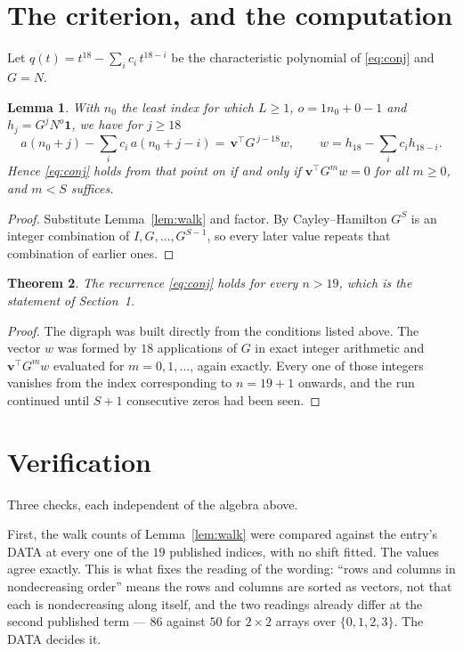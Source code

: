 \documentclass[11pt,a4paper]{article}
\theoremstyle{plain}
\newtheorem{theorem}{Theorem}
\newtheorem{lemma}[theorem]{Lemma}
\theoremstyle{definition}
\begin{document}
\section{The criterion, and the computation}

Let $q(t)=t^{18}-\sum_i c_i\,t^{18-i}$ be the characteristic polynomial of
\eqref{eq:conj} and $G=N$.

\begin{lemma}\label{lem:crit}
With $n_0$ the least index for which $L\ge1$, $o=1n_0+0-1$ and
$h_j=G^{j}N^{o}\mathbf{1}$, we have for $j\ge18$
\[
a(n_0+j)-\sum_i c_i\,a(n_0+j-i)=\,\mathbf{v}^{\!\top}G^{\,j-18}w,
\qquad w=h_{18}-\sum_i c_ih_{18-i} .
\]
Hence \eqref{eq:conj} holds from that point on if and only if
$\mathbf{v}^{\!\top}G^{m}w=0$ for all $m\ge0$, and $m<S$ suffices.
\end{lemma}

\begin{proof}
Substitute Lemma~\ref{lem:walk} and factor. By Cayley--Hamilton $G^{S}$ is an integer
combination of $I,G,\dots,G^{S-1}$, so every later value repeats that combination of
earlier ones.
\end{proof}

\begin{theorem}
The recurrence \eqref{eq:conj} holds for every $n>19$, which is the statement of
Section~1.
\end{theorem}

\begin{proof}
The digraph was built directly from the conditions listed above. The vector $w$ was formed by
$18$ applications of $G$ in exact integer arithmetic and $\mathbf{v}^{\!\top}G^{m}w$
evaluated for $m=0,1,\dots$, again exactly. Every one of those integers vanishes from the
index corresponding to $n=19+1$ onwards, and the run continued until $S+1$ consecutive
zeros had been seen.
\end{proof}

\section{Verification}

Three checks, each independent of the algebra above.

First, the walk counts of Lemma~\ref{lem:walk} were compared against the entry's DATA at
every one of the $19$ published indices, with no shift fitted. The values agree exactly.
This is what fixes the reading of the wording: ``rows and columns in nondecreasing order''
means the rows and columns are sorted as vectors, not that each is nondecreasing along
itself, and the two readings already differ at the second published term --- $86$ against
$50$ for $2\times2$ arrays over $\{0,1,2,3\}$. The DATA decides it.
\end{document}

